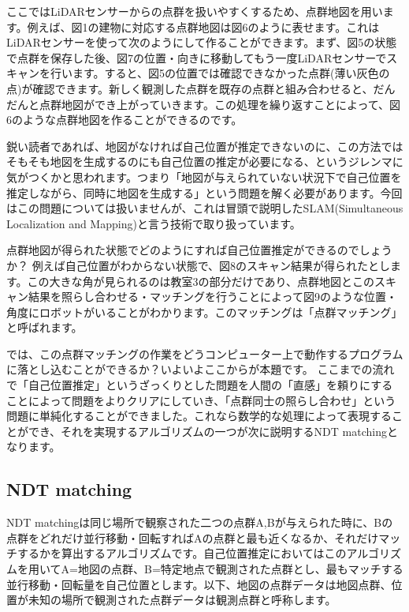 \documentclass[12pt]{article}
\begin{document}
ここではLiDARセンサーからの点群を扱いやすくするため、点群地図を用います。例えば、図1の建物に対応する点群地図は図6のように表せます。これはLiDARセンサーを使って次のようにして作ることができます。まず、図5の状態で点群を保存した後、図7の位置・向きに移動してもう一度LiDARセンサーでスキャンを行います。すると、図5の位置では確認できなかった点群(薄い灰色の点)が確認できます。新しく観測した点群を既存の点群と組み合わせると、だんだんと点群地図ができ上がっていきます。この処理を繰り返すことによって、図6のような点群地図を作ることができるのです。

鋭い読者であれば、地図がなければ自己位置が推定できないのに、この方法ではそもそも地図を生成するのにも自己位置の推定が必要になる、というジレンマに気がつくかと思われます。つまり「地図が与えられていない状況下で自己位置を推定しながら、同時に地図を生成する」という問題を解く必要があります。今回はこの問題については扱いませんが、これは冒頭で説明したSLAM(Simultaneous Localization and Mapping)\cite{1}と言う技術で取り扱っています。


点群地図が得られた状態でどのようにすれば自己位置推定ができるのでしょうか？
例えば自己位置がわからない状態で、図8のスキャン結果が得られたとします。この大きな角が見られるのは教室3の部分だけであり、点群地図とこのスキャン結果を照らし合わせる・マッチングを行うことによって図9のような位置・角度にロボットがいることがわかります。このマッチングは「点群マッチング」と呼ばれます。

では、この点群マッチングの作業をどうコンピューター上で動作するプログラムに落とし込むことができるか？いよいよここからが本題です。
ここまでの流れで「自己位置推定」というざっくりとした問題を人間の「直感」を頼りにすることによって問題をよりクリアにしていき、「点群同士の照らし合わせ」という問題に単純化することができました。これなら数学的な処理によって表現することができ、それを実現するアルゴリズムの一つが次に説明するNDT matching\cite{2}となります。


\subsection{NDT matching}


NDT matching\cite{2}は同じ場所で観察された二つの点群A,Bが与えられた時に、Bの点群をどれだけ並行移動・回転すればAの点群と最も近くなるか、それだけマッチするかを算出するアルゴリズムです。自己位置推定においてはこのアルゴリズムを用いてA=地図の点群、B=特定地点で観測された点群とし、最もマッチする並行移動・回転量を自己位置とします。以下、地図の点群データは地図点群、位置が未知の場所で観測された点群データは観測点群と呼称します。
\end{document}
